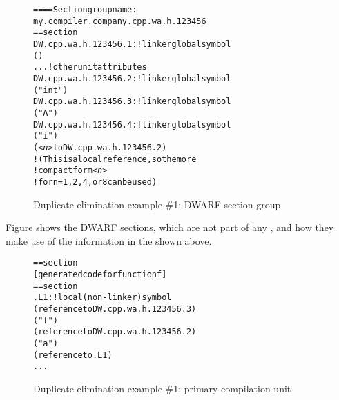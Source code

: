 \begin{figure}
\begin{dwflisting}
\begin{alltt}
==== Section group name:
    my.compiler.company.cpp.wa.h.123456
== section \dotdebuginfo{}
DW.cpp.wa.h.123456.1:     ! linker global symbol
        ()
        ...  ! other unit attributes
DW.cpp.wa.h.123456.2:     ! linker global symbol
        ("int")
DW.cpp.wa.h.123456.3:     ! linker global symbol
        ("A")
DW.cpp.wa.h.123456.4:     ! linker global symbol
        ("i")
        (\textit{<n>} to DW.cpp.wa.h.123456.2)
            ! (This is a local reference, so the more
            ! compact form \textit{<n>} 
            ! for n = 1,2,4, or 8 can be used)
\end{alltt}
\end{dwflisting}
\vspace{2mm}
\caption{Duplicate elimination example \#1: DWARF section group} 
\label{fig:duplicateeliminationexample1dwarfsectiongroup}
\end{figure}

Figure 
shows the  DWARF sections, which are not part of
any , 
and how they make use of the information
in the  shown above.

\begin{figure}
\begin{dwflisting}
\begin{alltt}
== section \dottext{}
    [generated code for function f]
== section \dotdebuginfo{}
.L1:                           ! local (non-linker) symbol
            (reference to DW.cpp.wa.h.123456.3)
            ("f")
            (reference to DW.cpp.wa.h.123456.2)
                ("a")
                (reference to .L1)
        ...
\end{alltt}
\end{dwflisting}
\caption{Duplicate elimination example \#1: primary compilation unit} 
\label{fig:duplicateeliminationexample1primarycompilationunit}
\end{figure}

